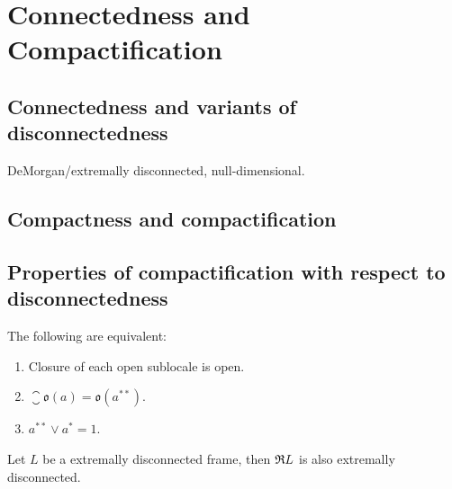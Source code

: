 \chapter{Connectedness and Compactification}
\section{Connectedness and variants of disconnectedness}
DeMorgan/extremally disconnected, null-dimensional.
\section{Compactness and compactification}
\section{Properties of compactification with respect to disconnectedness}
\begin{lemma}
    The following are equivalent:

    \begin{enumerate}
        \item Closure of each open sublocale is open.
        \item $\closure{\mathfrak{o}(a)} = \mathfrak{o}(a^{**})$.
        \item $a^{**} \vee a^* = 1$.
    \end{enumerate}
\end{lemma}

\begin{proposition}\label{p:extrDiscPreserv}
    Let $L$ be a extremally disconnected frame, then $\mathfrak{R} L$ is also extremally disconnected.
\end{proposition}

